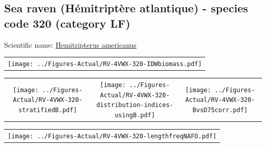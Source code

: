 \documentclass[12pt]{article}\usepackage[]{graphicx}\usepackage[]{color}
\begin{document}
\renewcommand\thefigure{\thesubsection\Alph{figure}}

\setcounter{figure}{0}

\hypertarget{sec:320}{%
\subsection{Sea raven (Hémitriptère atlantique) - species code 320 (category LF)}\label{sec:320}}

  


Scientific name: \href{http://www.marinespecies.org/aphia.php?p=taxdetails\&id=159518}{Hemitripterus americanus} \newline
\begin{minipage}{1.0\textwidth}
 \begin{tabular}{c}
\texttt{[image: ../Figures-Actual/RV-4VWX-320-IDWbiomass.pdf]} \\ 
\end{tabular} 
\end{minipage}
\newline

\vspace{1cm}
\begin{minipage}{1.0\textwidth}
 \begin{tabular}{ccc}
\texttt{[image: ../Figures-Actual/RV-4VWX-320-stratifiedB.pdf]} & 
\texttt{[image: ../Figures-Actual/RV-4VWX-320-distribution-indices-usingB.pdf]} & 
\texttt{[image: ../Figures-Actual/RV-4VWX-320-BvsD75corr.pdf]} \\ 
\end{tabular} 
\end{minipage}
\clearpage
\begin{minipage}{1.0\textwidth}
 \begin{tabular}{c}
\texttt{[image: ../Figures-Actual/RV-4VWX-320-lengthfreqNAFO.pdf]} \\ 
\end{tabular} 
\end{minipage}
\newline
\end{document}
